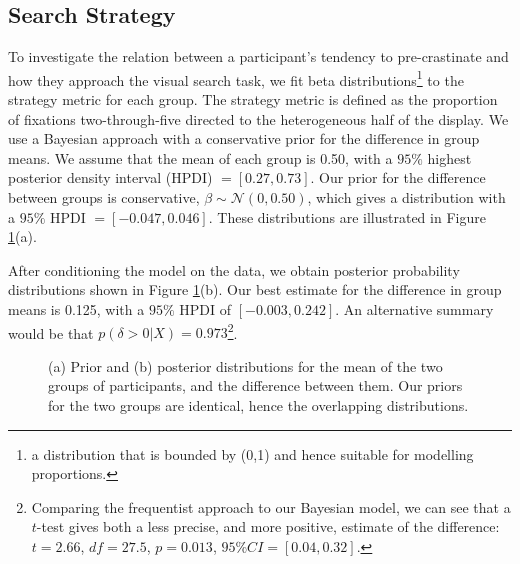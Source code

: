 \documentclass[]{rsos}
\begin{document}
\subsection{Search Strategy}
To investigate the relation between a participant's tendency to pre-crastinate and how they approach the visual search task, we fit beta distributions\footnote{a distribution that is bounded by (0,1) and hence suitable for modelling proportions.} to the strategy metric for each group. The strategy metric is defined as the proportion of fixations two-through-five directed to the heterogeneous half of the display. We use a Bayesian approach with a conservative prior for the difference in group means. We assume that the mean of each group is 0.50, with a $95\%$ highest posterior density interval (HPDI) $= [0.27, 0.73]$. Our prior for the difference between groups is conservative, $\beta \sim\mathcal{N}(0, 0.50)$, which gives a distribution with a $95\%$ HPDI $=[-0.047, 0.046]$. These distributions are illustrated in Figure \ref{fig:exp1_strategy}(a).

After conditioning the model on the data, we obtain posterior probability distributions shown in Figure \ref{fig:exp1_strategy}(b). Our best estimate for the difference in group means is 0.125, with a $95\%$ HPDI of $[-0.003, 0.242]$. An alternative summary would be that $p(\delta >0 | X)  = 0.973$\footnote{Comparing the frequentist approach to our Bayesian model, we can see that a $t$-test gives both a less precise, and more positive, estimate of the difference: $t=2.66$, $df = 27.5$, $p=0.013$, $95\%CI = [0.04, 0.32]$.}.

\begin{figure}[t]
  \centering  
  \caption{(a) Prior and (b) posterior distributions for the mean of the two groups of participants, and the difference between them. Our priors for the two groups are identical, hence the overlapping distributions.}
  \label{fig:exp1_strategy}
\end{figure}
\end{document}

